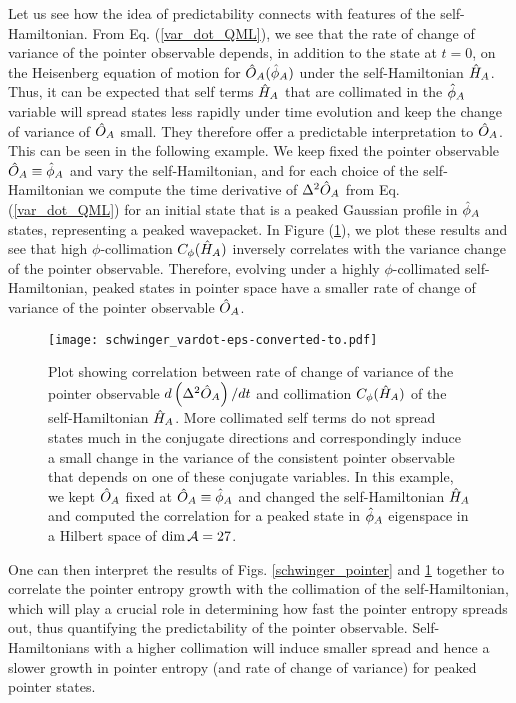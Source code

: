 \documentclass[aps,pra,onecolumn,nofootinbib,12pt,tightenlines]{revtex4-1}
\begin{document}
 Let us see how the idea of predictability connects with features of the self-Hamiltonian. From Eq. (\ref{var_dot_QML}), we see that the rate of change of variance of the pointer observable depends, in addition to the state at $t = 0$, on the Heisenberg equation of motion for $\hat{O}_{A}(\hat{\phi}_{A})$ under the self-Hamiltonian $\hat{H}_{A}$. Thus, it can be expected that self terms $\hat{H}_{A}$ that are collimated in the $\hat{\phi}_{A}$ variable will spread states less rapidly under time evolution and keep the change of variance of $\hat{O}_{A}$ small. They therefore offer a predictable interpretation to $\hat{O}_{A}$. This can be seen in the following example. We keep fixed the pointer observable $\hat{O}_{A} \equiv \hat{\phi}_{A}$ and vary the self-Hamiltonian, and for each choice of the self-Hamiltonian we compute the time derivative of $\Delta^2 \hat{O}_{A}$ from Eq. (\ref{var_dot_QML}) for an initial state that is a peaked Gaussian profile in $\hat{\phi}_{A}$ states, representing a peaked wavepacket.  In Figure (\ref{schwinger_vardot}), we plot these results and see that high $\phi$-collimation $C_{\phi}(\hat{H}_{A})$ inversely correlates with the variance change of the pointer observable. Therefore, evolving under a highly $\phi$-collimated self-Hamiltonian, peaked states in pointer space have a smaller rate of change of variance of the pointer observable $\hat{O}_{A}$.
 
\begin{figure}[h]
\texttt{[image: schwinger\_vardot-eps-converted-to.pdf]}
\caption{Plot showing correlation between rate of change of variance of the pointer observable $d \left(\Delta^{2} \hat{O}_{A}\right)/dt$ and collimation $C_{\phi}(\hat{H}_{A})$ of the self-Hamiltonian $\hat{H}_{A}$. More collimated self terms do not spread states much in the conjugate directions and correspondingly induce a small change in the variance of the consistent pointer observable that depends on one of these conjugate variables. In this example, we kept $\hat{O}_{A}$ fixed at $\hat{O}_{A} \equiv \hat{\phi}_{A}$ and changed the self-Hamiltonian $\hat{H}_{A}$ and computed the correlation for a peaked state in $\hat{\phi}_{A}$ eigenspace in a Hilbert space of $\textrm{dim\,} \mathcal{A} = 27$.}
\label{schwinger_vardot}
\end{figure}

One can then interpret the results of Figs. \ref{schwinger_pointer} and \ref{schwinger_vardot} together to correlate the pointer entropy growth with the collimation of the self-Hamiltonian, which will play a crucial role in determining how fast the pointer entropy spreads out, thus quantifying the predictability of the pointer observable. Self-Hamiltonians with a higher collimation will induce smaller spread and hence a slower growth in pointer entropy (and rate of change of variance) for peaked pointer states.
\end{document}
